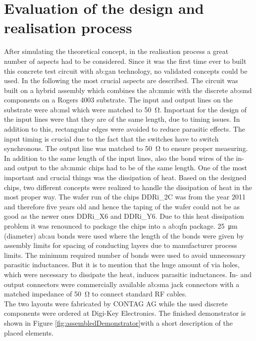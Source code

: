 \section{Evaluation of the design and realisation process}
After simulating the theoretical concept, in the realisation process a great number of aspects had to be considered.
Since it was the first time ever to built this concrete test circuit with \gls{ab:gan} technology, no validated concepts could be used.
In the following the most crucial aspects are described.
The circuit was built on a hybrid assembly which combines the \gls{ab:mmic} with the discrete \gls{ab:smd} components on a Rogers 4003 substrate.
The input and output lines on the substrate were \gls{ab:msl} which were matched to \SI{50}{\ohm}.
Important for the design of the input lines were that they are of the same length, due to timing issues.
In addition to this, rectangular edges were avoided to reduce parasitic effects.
The input timing is crucial due to the fact that the switches have to switch synchronous.
The output line was matched to \SI{50}{\ohm} to ensure proper measuring.
In addition to the same length of the input lines, also the bond wires of the in- and output to the \gls{ab:mmic} chips had to be of the same length.
One of the most important and crucial things was the dissipation of heat.
Based on the designed chips, two different concepts were realized to handle the dissipation of heat in the most proper way.
The wafer run of the chips DDRi\_2C was from the year 2011 and therefore five years old and hence the taping of the wafer could not be as good as the newer ones DDRi\_X6 and DDRi\_Y6.
Due to this heat dissipation problem it was renounced to package the chips into a \gls{ab:qfn} package.
\SI{25}{\micro \metre} (diameter) \gls{ab:au} bonds were used where the length of the bonds were given by assembly limits for spacing of conducting layers due to manufacturer process limits.
The minimum required number of bonds were used to avoid unnecessary parasitic inductances. 
But it is to mention that the huge amount of via holes, which were necessary to dissipate the heat, induces parasitic inductances.
In- and output connectors were commercially available \gls{ab:sma} jack connectors with a matched impedance of \SI{50}{\ohm} to connect standard RF cables.\\
The two layouts were fabricated by CONTAG AG while the used discrete components were ordered at Digi-Key Electronics.
The finished demonstrator is shown in Figure \ref{fig:assembledDemonstrator}with a short description of the placed elements.


